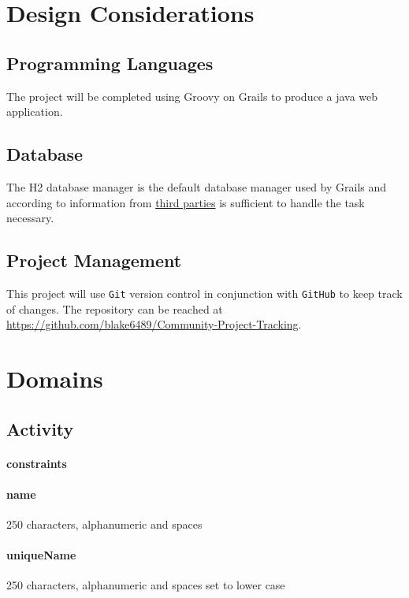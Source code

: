 \documentclass[12pt]{article}
\newcommand{\e}[1] {{\tt #1}}
\begin{document}
\section{Design Considerations}

\subsection{Programming Languages}
The project will be completed using Groovy on Grails to produce a java web application. 

\subsection{Database}
The H2 database manager is the default database manager used by Grails and according to information from \href{http://database-management-systems.findthebest.com/compare/16-30/H2-vs-MySQL}{third parties} is sufficient to handle the task necessary.

\subsection{Project Management}
This project will use \e{Git} version control in conjunction with \e{GitHub} to keep track of changes. The repository can be reached at \url{https://github.com/blake6489/Community-Project-Tracking}.

\section{Domains}\label{sec:Domains}
\setcounter{paragraph}{0}
\subsection{Activity}
\paragraph{constraints}
\paragraph{name} 250 characters, alphanumeric and spaces 
\paragraph{uniqueName} 250 characters, alphanumeric and spaces  set to lower case
\end{document}
